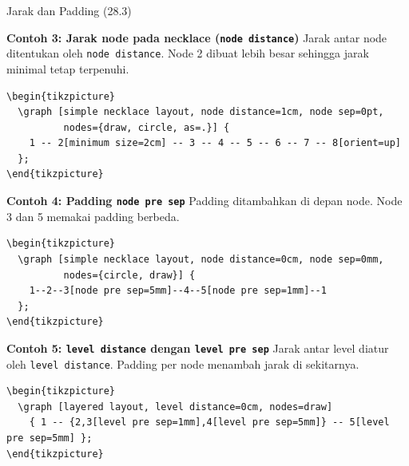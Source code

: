 \documentclass[aspectratio=169]{beamer}
\begin{document}
\begin{frame}{Jarak dan Padding (28.3)}


\textbf{Contoh 3: Jarak node pada necklace (\texttt{node distance})}
Jarak antar node ditentukan oleh \texttt{node distance}. Node 2 dibuat lebih besar sehingga jarak minimal tetap terpenuhi.
\begin{lstlisting}
\begin{tikzpicture}
  \graph [simple necklace layout, node distance=1cm, node sep=0pt,
          nodes={draw, circle, as=.}] {
    1 -- 2[minimum size=2cm] -- 3 -- 4 -- 5 -- 6 -- 7 -- 8[orient=up]
  };
\end{tikzpicture}
\end{lstlisting}
\begin{center}\end{center}


\textbf{Contoh 4: Padding \texttt{node pre sep}}
Padding ditambahkan di depan node. Node 3 dan 5 memakai padding berbeda.
\begin{lstlisting}
\begin{tikzpicture}
  \graph [simple necklace layout, node distance=0cm, node sep=0mm,
          nodes={circle, draw}] {
    1--2--3[node pre sep=5mm]--4--5[node pre sep=1mm]--1
  };
\end{tikzpicture}
\end{lstlisting}
\begin{center}\end{center}


\textbf{Contoh 5: \texttt{level distance} dengan \texttt{level pre sep}}
Jarak antar level diatur oleh \texttt{level distance}. Padding per node menambah jarak di sekitarnya.
\begin{lstlisting}
\begin{tikzpicture}
  \graph [layered layout, level distance=0cm, nodes=draw]
    { 1 -- {2,3[level pre sep=1mm],4[level pre sep=5mm]} -- 5[level pre sep=5mm] };
\end{tikzpicture}
\end{lstlisting}
\begin{center}\end{center}



\end{frame}
\end{document}
